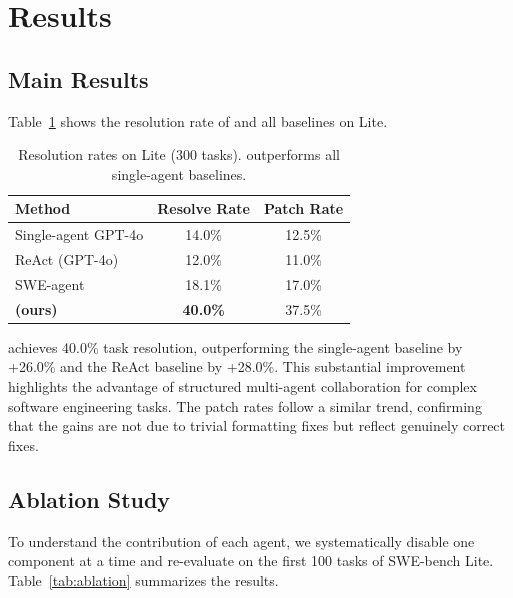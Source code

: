 
\section{Results}
\label{sec:results}

\subsection{Main Results}

Table~\ref{tab:main} shows the resolution rate of
\texttt{\agentforge{}} and all baselines on \texttt{\swebench{}} Lite.

\begin{table}[t]
\centering
\caption{%
  Resolution rates on \swebench{} Lite (300 tasks).
  \texttt{\agentforge{}} outperforms all single-agent baselines.
}
\label{tab:main}
\begin{tabular}{lcc}
\toprule
Method                        & Resolve Rate & Patch Rate \\
\midrule
Single-agent GPT-4o           & 14.0\% & 12.5\% \\
ReAct (GPT-4o)                & 12.0\% & 11.0\% \\
SWE-agent~\cite{yang2024sweagent} & 18.1\%   & 17.0\% \\
\midrule
\textbf{\texttt{\agentforge{}} (ours)} & \textbf{40.0\%} & 37.5\% \\
\bottomrule
\end{tabular}
\end{table}


\texttt{\agentforge{}} achieves 40.0\% task resolution,
outperforming the single-agent baseline by
+26.0\% and the ReAct baseline by
+28.0\%.
This substantial improvement highlights the advantage of
structured multi-agent collaboration for complex software
engineering tasks. The patch rates follow a similar trend,
confirming that the gains are not due to trivial formatting
fixes but reflect genuinely correct fixes.

\subsection{Ablation Study}
\label{sec:ablation}

To understand the contribution of each agent, we systematically disable one component at a time and re-evaluate on the first 100 tasks of SWE-bench Lite. Table~\ref{tab:ablation} summarizes the results.

